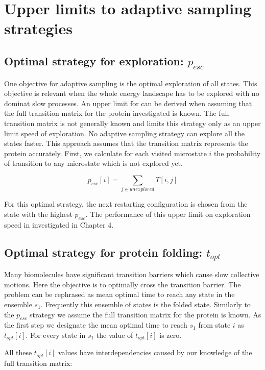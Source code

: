 \section{Upper limits to adaptive sampling strategies}

\subsection{Optimal strategy for exploration: $p_{esc}$}

One objective for adaptive sampling is the optimal exploration of all states. This objective is relevant when the whole energy landscape has to be explored with no dominat slow processes. 
An upper limit for can be derived when assuming that the full transition matrix for the protein investigated is known. The full transition matrix is not generally known and limits this strategy only as an upper limit speed of exploration. No adaptive sampling strategy can explore all the states faster. This approach assumes that the transition matrix represents the protein accurately.
First, we calculate for each visited microstate $i$ the probability of transition to any microstate which is not explored yet.

$$p_{esc}[i]=\sum_{j \in unexplored}T[i, j]$$

For this optimal strategy, the next restarting configuration is chosen from the state with the highest $p_{esc}$. The performance of this upper limit on exploration speed in investigated in Chapter 4.

\subsection{Optimal strategy for protein folding: $t_{opt}$} 

Many biomolecules have significant transition barriers which cause slow collective motions. Here the objective is to optimally cross the transition barrier.
The problem can be rephrased as mean optimal time to reach any state in the ensemble  $s_1$. Frequently this ensemble of states is the folded state.  
Similarly to the $p_{esc}$ strategy we assume the full transition matrix for the protein is known. As the first step we designate the mean optimal time to reach $s_1$ from state $i$ as $t_{opt}[i]$.
For every state in $s_1$ the value of  $t_{opt}[i]$ is zero.

All these $t_{opt}[i]$ values have interdependencies caused by our knowledge of the full transition matrix:

